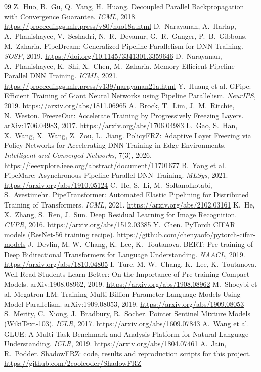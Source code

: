 \documentclass[10pt,twocolumn]{article}
\begin{document}
{\small
\begin{thebibliography}{99}\setlength{\itemsep}{0pt}
 Z.~Huo, B.~Gu, Q.~Yang, H.~Huang. Decoupled Parallel Backpropagation with Convergence Guarantee. \emph{ICML}, 2018. \url{https://proceedings.mlr.press/v80/huo18a.html}
 D.~Narayanan, A.~Harlap, A.~Phanishayee, V.~Seshadri, N.~R.~Devanur, G.~R.~Ganger, P.~B.~Gibbons, M.~Zaharia. PipeDream: Generalized Pipeline Parallelism for DNN Training. \emph{SOSP}, 2019. \url{https://doi.org/10.1145/3341301.3359646}
 D.~Narayanan, A.~Phanishayee, K.~Shi, X.~Chen, M.~Zaharia. Memory-Efficient Pipeline-Parallel DNN Training. \emph{ICML}, 2021. \url{https://proceedings.mlr.press/v139/narayanan21a.html}
 Y.~Huang et al. GPipe: Efficient Training of Giant Neural Networks using Pipeline Parallelism. \emph{NeurIPS}, 2019. \url{https://arxiv.org/abs/1811.06965}
 A.~Brock, T.~Lim, J.~M.~Ritchie, N.~Weston. FreezeOut: Accelerate Training by Progressively Freezing Layers. arXiv:1706.04983, 2017. \url{https://arxiv.org/abs/1706.04983}
 L.~Gao, S.~Han, X.~Wang, X.~Wang, Z.~Zou, L.~Jiang. PolicyFRZ: Adaptive Layer Freezing via Policy Networks for Accelerating DNN Training in Edge Environments. \emph{Intelligent and Converged Networks}, 7(3), 2026. \url{https://ieeexplore.ieee.org/abstract/document/11701677}
 B.~Yang et al. PipeMare: Asynchronous Pipeline Parallel DNN Training. \emph{MLSys}, 2021. \url{https://arxiv.org/abs/1910.05124}
 C.~He, S.~Li, M.~Soltanolkotabi, S.~Avestimehr. PipeTransformer: Automated Elastic Pipelining for Distributed Training of Transformers. \emph{ICML}, 2021. \url{https://arxiv.org/abs/2102.03161}
 K.~He, X.~Zhang, S.~Ren, J.~Sun. Deep Residual Learning for Image Recognition. \emph{CVPR}, 2016. \url{https://arxiv.org/abs/1512.03385}
 Y.~Chen. PyTorch CIFAR models (ResNet-56 training recipe). \url{https://github.com/chenyaofo/pytorch-cifar-models}
 J.~Devlin, M.-W.~Chang, K.~Lee, K.~Toutanova. BERT: Pre-training of Deep Bidirectional Transformers for Language Understanding. \emph{NAACL}, 2019. \url{https://arxiv.org/abs/1810.04805}
 I.~Turc, M.-W.~Chang, K.~Lee, K.~Toutanova. Well-Read Students Learn Better: On the Importance of Pre-training Compact Models. arXiv:1908.08962, 2019. \url{https://arxiv.org/abs/1908.08962}
 M.~Shoeybi et al. Megatron-LM: Training Multi-Billion Parameter Language Models Using Model Parallelism. arXiv:1909.08053, 2019. \url{https://arxiv.org/abs/1909.08053}
 S.~Merity, C.~Xiong, J.~Bradbury, R.~Socher. Pointer Sentinel Mixture Models (WikiText-103). \emph{ICLR}, 2017. \url{https://arxiv.org/abs/1609.07843}
 A.~Wang et al. GLUE: A Multi-Task Benchmark and Analysis Platform for Natural Language Understanding. \emph{ICLR}, 2019. \url{https://arxiv.org/abs/1804.07461}
 A.~Jain, R.~Podder. ShadowFRZ: code, results and reproduction scripts for this project. \url{https://github.com/2coolcoder/ShadowFRZ}
\end{thebibliography}
}
\end{document}
